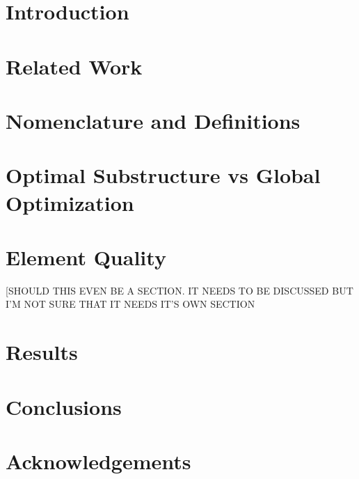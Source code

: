 \documentclass[11pt]{article}
\begin{document}
\section{Introduction}


\section{Related Work}

\section{Nomenclature and Definitions}


\section{Optimal Substructure vs Global Optimization}


\section{Element Quality}
[SHOULD THIS EVEN BE A SECTION. IT NEEDS TO BE DISCUSSED BUT I'M NOT
SURE THAT IT NEEDS IT'S OWN SECTION

\section{Results}

\section{Conclusions}

\section{Acknowledgements}
\end{document}
